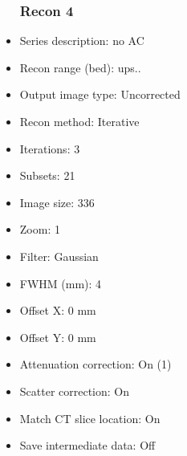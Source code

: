 \documentclass[12pt]{article}
\begin{document}
\begin{itemize}
\subsubsection{Recon 4}
\item Series description: no AC
\item Recon range (bed): ups..
\item Output image type: Uncorrected
\item Recon method: Iterative
\item Iterations: 3
\item Subsets: 21
\item Image size: 336
\item Zoom: 1
\item Filter: Gaussian
\item FWHM (mm): 4
\item Offset X: 0 mm
\item Offset Y: 0 mm
\item Attenuation correction: On (1)
\item Scatter correction: On
\item Match CT slice location: On
\item Save intermediate data: Off
\end{itemize}
\end{document}
